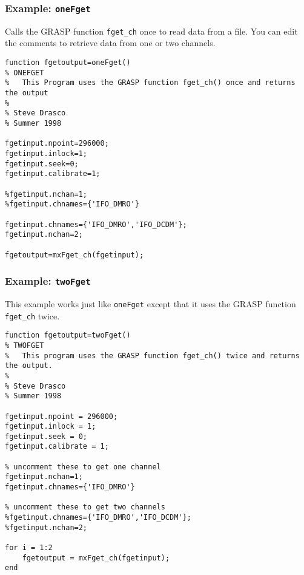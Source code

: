\subsubsection{Example: {\tt oneFget}}
\label{sss:oneFget}

Calls the GRASP function \texttt{fget\_ch} once to read data from a file. You
can edit the comments to retrieve data from one or two channels.

\begin{verbatim}
function fgetoutput=oneFget()
% ONEFGET
%	This Program uses the GRASP function fget_ch() once and returns the output
%
% Steve Drasco
% Summer 1998

fgetinput.npoint=296000;
fgetinput.inlock=1;
fgetinput.seek=0;
fgetinput.calibrate=1;

%fgetinput.nchan=1;
%fgetinput.chnames={'IFO_DMRO'}

fgetinput.chnames={'IFO_DMRO','IFO_DCDM'};
fgetinput.nchan=2;

fgetoutput=mxFget_ch(fgetinput);
\end{verbatim}

\subsubsection{Example: {\tt twoFget}}
\label{sss:twoFget}

This example works just like \texttt{oneFget} except that it uses the GRASP
function \texttt{fget\_ch} twice.

\begin{verbatim}
function fgetoutput=twoFget()
% TWOFGET
%	This program uses the GRASP function fget_ch() twice and returns the output.
%
% Steve Drasco
% Summer 1998

fgetinput.npoint = 296000;
fgetinput.inlock = 1;
fgetinput.seek = 0;
fgetinput.calibrate = 1;

% uncomment these to get one channel
fgetinput.nchan=1;
fgetinput.chnames={'IFO_DMRO'}

% uncomment these to get two channels
%fgetinput.chnames={'IFO_DMRO','IFO_DCDM'};
%fgetinput.nchan=2;

for i = 1:2
	fgetoutput = mxFget_ch(fgetinput);
end
\end{verbatim}
